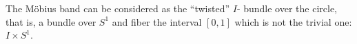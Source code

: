 \documentclass[12pt]{article}
\begin{document}
The M\"{o}bius band can be considered as the ``twisted'' $I$- bundle over the circle, that is, a bundle over $S^1$ and fiber the interval $[0,1]$ which is not the trivial one: $I\times S^1$.
\end{document}
